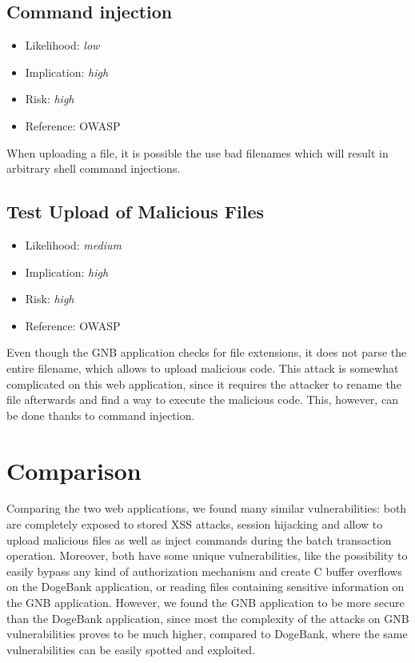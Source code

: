 \subsection{Command injection} \label{over:gnb_command}
\begin{itemize}
	\item Likelihood: \textit{low}
	\item Implication: \textit{high}
	\item Risk: \textit{high}
	\item Reference: OWASP 
\end{itemize}
When uploading a file, it is possible the use bad filenames which will result in arbitrary shell command injections.

\subsection{Test Upload of Malicious Files} \label{over:gnb_malicious}
\begin{itemize}
	\item Likelihood: \textit{medium}
	\item Implication: \textit{high}
	\item Risk: \textit{high}
	\item Reference: OWASP 
\end{itemize}
Even though the GNB application checks for file extensions, it does not parse the entire filename, which allows to upload malicious code. This attack is somewhat complicated on this web application, since it requires the attacker to rename the file afterwards and find a way to execute the malicious code. This, however, can be done thanks to command injection.
	
\section{Comparison}
Comparing the two web applications, we found many similar vulnerabilities: both are completely exposed to stored XSS attacks, session hijacking and allow to upload malicious files as well as inject commands during the batch transaction operation.\newline
Moreover, both have some unique vulnerabilities, like the possibility to easily bypass any kind of authorization mechanism and create C buffer overflows on the DogeBank application, or reading files containing sensitive information on the GNB application.\newline
However, we found the GNB application to be more secure than the DogeBank application, since most the complexity of the attacks on GNB vulnerabilities proves to be much higher, compared to DogeBank, where the same vulnerabilities can be easily spotted and exploited.